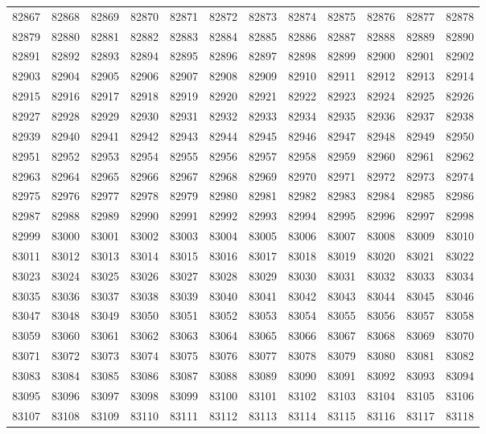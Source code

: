 \begin{center}
\begin{longtable}{llllllllllll}
82867 &82868 &82869 &82870 &82871 &82872 &82873 &82874 &82875 &82876 &82877 &82878 \\
82879 &82880 &82881 &82882 &82883 &82884 &82885 &82886 &82887 &82888 &82889 &82890 \\
82891 &82892 &82893 &82894 &82895 &82896 &82897 &82898 &82899 &82900 &82901 &82902 \\
82903 &82904 &82905 &82906 &82907 &82908 &82909 &82910 &82911 &82912 &82913 &82914 \\
82915 &82916 &82917 &82918 &82919 &82920 &82921 &82922 &82923 &82924 &82925 &82926 \\
82927 &82928 &82929 &82930 &82931 &82932 &82933 &82934 &82935 &82936 &82937 &82938 \\
82939 &82940 &82941 &82942 &82943 &82944 &82945 &82946 &82947 &82948 &82949 &82950 \\
82951 &82952 &82953 &82954 &82955 &82956 &82957 &82958 &82959 &82960 &82961 &82962 \\
82963 &82964 &82965 &82966 &82967 &82968 &82969 &82970 &82971 &82972 &82973 &82974 \\
82975 &82976 &82977 &82978 &82979 &82980 &82981 &82982 &82983 &82984 &82985 &82986 \\
82987 &82988 &82989 &82990 &82991 &82992 &82993 &82994 &82995 &82996 &82997 &82998 \\
82999 &83000 &83001 &83002 &83003 &83004 &83005 &83006 &83007 &83008 &83009 &83010 \\
83011 &83012 &83013 &83014 &83015 &83016 &83017 &83018 &83019 &83020 &83021 &83022 \\
83023 &83024 &83025 &83026 &83027 &83028 &83029 &83030 &83031 &83032 &83033 &83034 \\
83035 &83036 &83037 &83038 &83039 &83040 &83041 &83042 &83043 &83044 &83045 &83046 \\
83047 &83048 &83049 &83050 &83051 &83052 &83053 &83054 &83055 &83056 &83057 &83058 \\
83059 &83060 &83061 &83062 &83063 &83064 &83065 &83066 &83067 &83068 &83069 &83070 \\
83071 &83072 &83073 &83074 &83075 &83076 &83077 &83078 &83079 &83080 &83081 &83082 \\
83083 &83084 &83085 &83086 &83087 &83088 &83089 &83090 &83091 &83092 &83093 &83094 \\
83095 &83096 &83097 &83098 &83099 &83100 &83101 &83102 &83103 &83104 &83105 &83106 \\
83107 &83108 &83109 &83110 &83111 &83112 &83113 &83114 &83115 &83116 &83117 &83118 \\

\end{longtable}
\end{center}
